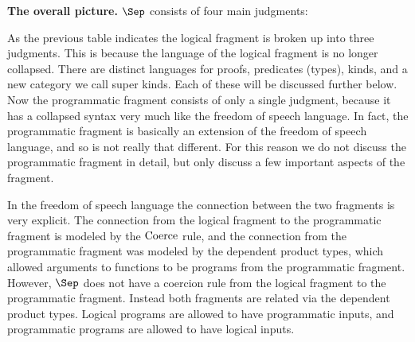\textbf{The overall picture.}  $\Sep$ consists of four main judgments:
\begin{center}
\end{center}
As the previous table indicates the logical fragment is broken up into
three judgments.  This is because the language of the logical fragment
is no longer collapsed.  There are distinct languages for proofs,
predicates (types), kinds, and a new category we call super kinds.
Each of these will be discussed further below.  Now the programmatic
fragment consists of only a single judgment, because it has a
collapsed syntax very much like the freedom of speech language.  In
fact, the programmatic fragment is basically an extension of the
freedom of speech language, and so is not really that different. For
this reason we do not discuss the programmatic fragment in detail, but
only discuss a few important aspects of the fragment.  

In the freedom of speech language the connection between the two
fragments is very explicit.  The connection from the logical fragment
to the programmatic fragment is modeled by the
${\normalfont\scriptsize \text{\normalsize Coerce}}$
rule, and the connection from the programmatic fragment was modeled by
the dependent product types, which allowed arguments to functions to be
programs from the programmatic fragment.  However, $\Sep$ does not
have a coercion rule from the logical fragment to the programmatic
fragment.  Instead both fragments are related via the dependent
product types.  Logical programs are allowed to have programmatic
inputs, and programmatic programs are allowed to have logical
inputs.  

